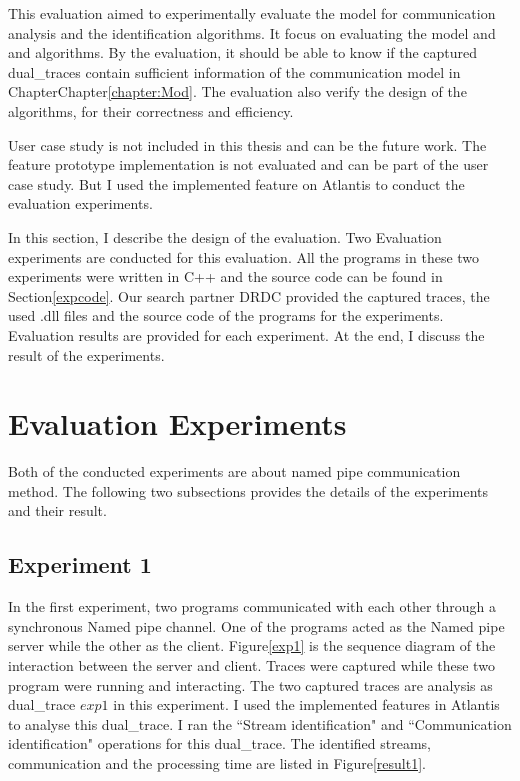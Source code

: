 


\label{chapter:Exp}
This evaluation aimed to experimentally evaluate the model for communication analysis and the identification algorithms. It focus on evaluating the model and and algorithms. By the evaluation, it should be able to know if the captured dual\_traces contain sufficient information of the communication model in ChapterChapter\ref{chapter:Mod}. The evaluation also verify the design of the algorithms, for their correctness and efficiency.  

User case study is not included in this thesis and can be the future work. The feature prototype implementation is not evaluated and can be part of the user case study. But I used the implemented feature on Atlantis to conduct the evaluation experiments.

In this section, I describe the design of the evaluation. Two Evaluation experiments are conducted for this evaluation.  All the programs in these two experiments were written in C++ and the source code can be found in Section\ref{expcode}. Our search partner DRDC provided the captured traces, the used .dll files and  the source code of the programs for the experiments. Evaluation results are provided for each experiment. At the end, I discuss the result of the experiments.  

\section{Evaluation Experiments}
Both of the conducted experiments are about named pipe communication method. The following two subsections provides the details of the experiments and their result.
\subsection{Experiment 1}
In the first experiment, two programs communicated with each other through a synchronous Named pipe channel. One of the programs acted as the Named pipe server while the other as the client. Figure\ref{exp1} is the sequence diagram of the interaction between the server and client. Traces were captured while these two program were running and interacting. The two captured traces are analysis as dual\_trace $exp1$ in this experiment. I used the implemented features in Atlantis to analyse this dual\_trace. I ran the ``Stream identification" and ``Communication identification" operations for this dual\_trace. The identified streams, communication and the processing time are listed in Figure\ref{result1}.

